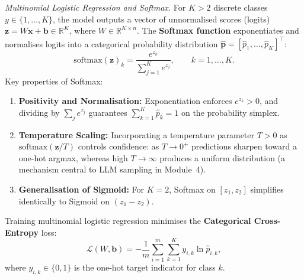 \documentclass[11pt,a4paper]{article}
\begin{document}
	\emph{Multinomial Logistic Regression and Softmax.} For $K > 2$ discrete classes $y \in \{1, \dots, K\}$, the model outputs a vector of unnormalised scores (logits) $\mathbf{z} = W\mathbf{x} + \mathbf{b} \in \mathbb{R}^K$, where $W \in \mathbb{R}^{K \times n}$. The \textbf{Softmax function} exponentiates and normalises logits into a categorical probability distribution $\hat{\mathbf{p}} = [\hat{p}_1, \dots, \hat{p}_K]^{\!\top}$:
	\begin{equation}
		\mathrm{softmax}(\mathbf{z})_k = \frac{e^{z_k}}{\sum_{j=1}^{K} e^{z_j}}, \qquad k = 1, \dots, K.
	\end{equation}
	Key properties of Softmax:
	\begin{enumerate}
		\item \textbf{Positivity and Normalisation:} Exponentiation enforces $e^{z_k} > 0$, and dividing by $\sum_j e^{z_j}$ guarantees $\sum_{k=1}^K \hat{p}_k = 1$ on the probability simplex.
		\item \textbf{Temperature Scaling:} Incorporating a temperature parameter $T > 0$ as $\mathrm{softmax}(\mathbf{z}/T)$ controls confidence: as $T \to 0^+$ predictions sharpen toward a one-hot argmax, whereas high $T \to \infty$ produces a uniform distribution (a mechanism central to LLM sampling in Module~4).
		\item \textbf{Generalisation of Sigmoid:} For $K=2$, Softmax on $[z_1, z_2]$ simplifies identically to Sigmoid on $(z_1 - z_2)$.
	\end{enumerate}
	Training multinomial logistic regression minimises the \textbf{Categorical Cross-Entropy} loss:
	\begin{equation}
		\mathcal{L}(W, \mathbf{b}) = -\frac{1}{m} \sum_{i=1}^{m} \sum_{k=1}^{K} y_{i,k} \ln \hat{p}_{i,k},
	\end{equation}
	where $y_{i,k} \in \{0, 1\}$ is the one-hot target indicator for class $k$.
	
	\begin{practicebox}

	\end{practicebox}
	
\end{document}
